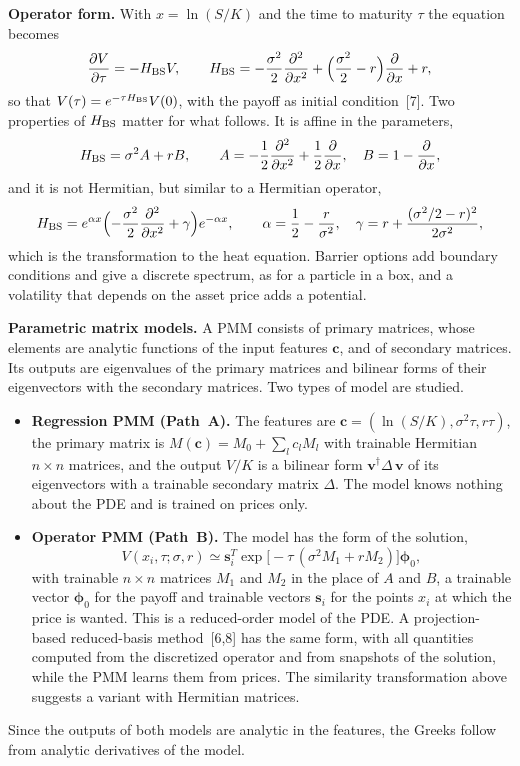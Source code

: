 \documentclass[12pt,a4paper]{article}
\begin{document}
\textbf{Operator form.}  With $x=\ln(S/K)$ and the time to maturity
$\tau$ the equation becomes
\[
  \frac{\partial V}{\partial\tau}=-H_{\rm BS}V,\qquad
  H_{\rm BS}=-\frac{\sigma^2}{2}\frac{\partial^2}{\partial x^2}
  +\Bigl(\frac{\sigma^2}{2}-r\Bigr)\frac{\partial}{\partial x}+r ,
\]
so that $V(\tau)=e^{-\tau H_{\rm BS}}V(0)$, with the payoff as initial
condition~[7].  Two properties of $H_{\rm BS}$ matter for what
follows.  It is affine in the parameters,
\[
  H_{\rm BS}=\sigma^2A+rB,\qquad
  A=-\frac12\frac{\partial^2}{\partial x^2}+\frac12\frac{\partial}{\partial x},
  \quad B=1-\frac{\partial}{\partial x},
\]
and it is not Hermitian, but similar to a Hermitian operator,
\[
  H_{\rm BS}=e^{\alpha x}\Bigl(-\frac{\sigma^2}{2}\frac{\partial^2}{\partial x^2}
  +\gamma\Bigr)e^{-\alpha x},\qquad
  \alpha=\frac12-\frac{r}{\sigma^2},\quad
  \gamma=r+\frac{(\sigma^2/2-r)^2}{2\sigma^2},
\]
which is the transformation to the heat equation.  Barrier options
add boundary conditions and give a discrete spectrum, as for a
particle in a box, and a volatility that depends on the asset price
adds a potential.

\textbf{Parametric matrix models.}  A PMM consists of primary
matrices, whose elements are analytic functions of the input features
$\boldsymbol c$, and of secondary matrices.  Its outputs are
eigenvalues of the primary matrices and bilinear forms of their
eigenvectors with the secondary matrices.  Two types of model are
studied.
\begin{itemize}
  \item \textbf{Regression PMM (Path~A).}  The features are
  $\boldsymbol c=(\ln(S/K),\sigma^2\tau,r\tau)$, the primary matrix is
  $M(\boldsymbol c)=M_0+\sum_lc_lM_l$ with trainable Hermitian
  $n\times n$ matrices, and the output $V/K$ is a bilinear form
  $\boldsymbol v^\dagger\Delta\,\boldsymbol v$ of its eigenvectors
  with a trainable secondary matrix $\Delta$.  The model knows nothing about the PDE
  and is trained on prices only.
  \item \textbf{Operator PMM (Path~B).}  The model has the form of the
  solution,
  \[
    V(x_i,\tau;\sigma,r)\simeq\boldsymbol s_i^{T}
    \exp\bigl[-\tau\,(\sigma^2M_1+rM_2)\bigr]\boldsymbol\phi_0 ,
  \]
  with trainable $n\times n$ matrices $M_1$ and $M_2$ in the place of
  $A$ and $B$, a trainable vector $\boldsymbol\phi_0$ for the payoff
  and trainable vectors $\boldsymbol s_i$ for the points $x_i$ at
  which the price is wanted.  This is a reduced-order model of the
  PDE.  A projection-based reduced-basis method~[6,8] has the same
  form, with all quantities computed from the discretized operator and
  from snapshots of the solution, while the PMM learns them from
  prices.  The similarity transformation above suggests a variant with
  Hermitian matrices.
\end{itemize}
Since the outputs of both models are analytic in the features, the
Greeks follow from analytic derivatives of the model.
\end{document}
